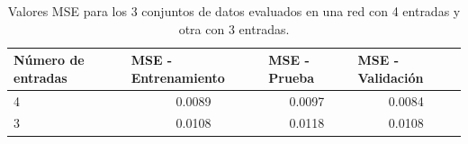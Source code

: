\documentclass[12pt]{article}
\begin{document}
\begin{itemize}
	\begin{table}[h!]
		\centering
		\captionsetup{justification=centering}
		\caption{Valores MSE para los 3 conjuntos de datos evaluados en una red con 4 entradas y otra con 3 entradas.}
		\begin{tabular}{|l|c|c|c|}
			\hline
			Número de entradas & \multicolumn{1}{l|}{MSE - Entrenamiento} & \multicolumn{1}{l|}{MSE - Prueba} & \multicolumn{1}{l|}{MSE - Validación} \\ \hline
			4                  & 0.0089                                   & 0.0097                            & 0.0084                                \\ \hline
			3                  & 0.0108                                   & 0.0118                           & 0.0108                                \\ \hline
		\end{tabular}
	\label{tabla_red_4_3}
	\end{table}


\end{itemize}
\end{document}
